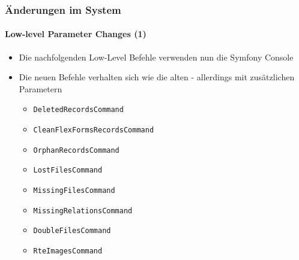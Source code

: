 \begin{frame}[fragile]
	\frametitle{Änderungen im System}
	\framesubtitle{Low-level Parameter Changes (1)}


	\begin{itemize}
		\item Die nachfolgenden Low-Level Befehle verwenden nun die Symfony Console
		\item Die neuen Befehle verhalten sich wie die alten - allerdings mit zusätzlichen Parametern

			\begin{itemize}
				\item \texttt{DeletedRecordsCommand}
				\item \texttt{CleanFlexFormsRecordsCommand}
				\item \texttt{OrphanRecordsCommand}
				\item \texttt{LostFilesCommand}
				\item \texttt{MissingFilesCommand}
				\item \texttt{MissingRelationsCommand}
				\item \texttt{DoubleFilesCommand}
				\item \texttt{RteImagesCommand}
			\end{itemize}

	\end{itemize}

\end{frame}



